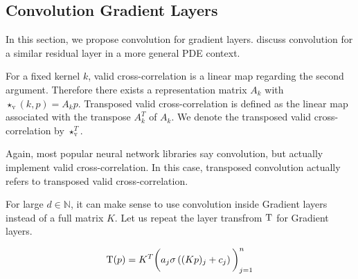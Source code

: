 \documentclass[twoside,a4paper]{article}
\begin{document}
\subsection{Convolution Gradient Layers}\label{sec_conv_gradient_layer}

In this section, we propose convolution for gradient layers.
\citet{Ruthotto2020} discuss convolution for a similar residual layer in a more 
general PDE context.

For a fixed kernel $k$, valid cross-correlation is a linear map regarding the second argument. 
Therefore there exists a representation matrix $A_{k}$ with 
$\star_{\text{v}}(k,p) = A_{k}p$. Transposed valid cross-correlation 
is defined as the linear map associated with the transpose $A_{k}^T$ of $A_{k}$.
We denote the transposed valid cross-correlation by $\star_{\text{v}}^T$.

Again, most popular neural network libraries say convolution, but actually implement
valid cross-correlation. In this case, transposed convolution actually refers to
transposed valid cross-correlation.

For large $d \in \mathbb{N}$, it can make sense to use convolution inside Gradient layers 
instead of a full matrix $K$. Let us repeat the layer transfrom $\mathrm{T}$ for Gradient layers.

\begin{equation*}
	\mathrm{T}(p) = K^T \bigg( a_j \sigma \left( (Kp)_j + c_j \right) \bigg)_{j=1}^n
\end{equation*}
\end{document}
